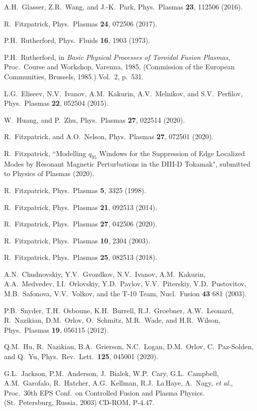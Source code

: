 \documentclass[12pt,prb,aps]{revtex4-1}
\begin{document}
\begin{thebibliography}{99}
 A.H.~Glasser, Z.R.~Wang, and J.-K.~Park, Phys.\ Plasmas {\bf 23}, 112506 (2016).

 R.~Fitzpatrick, Phys.\ Plasmas {\bf 24}, 072506 (2017). 

 P.H.~Rutherford,  Phys.\ Fluids  {\bf 16}, 1903 (1973).

 P.H.~Rutherford, in  {\it Basic Physical Processes of
Toroidal Fusion Plasmas}, Proc.\ Course and Workshop, Varenna, 1985. (Commission of the European Communities, Brussels, 1985.) Vol.~2, p.~531.

 L.G.~Eliseev, N.V.~Ivanov, A.M.~Kakurin, A.V.~Melnikov, and S.V.~Perfilov, Phys.\ Plasmas {\bf 22}, 052504 (2015). 

 W.~Huang, and P.~Zhu, Phys.\ Plasmas {\bf 27}, 022514 (2020).

 R.~Fitzpatrick, and A.O.~Nelson, Phys.\ Plasmas {\bf 27}, 072501 (2020).

 R.~Fitzpatrick,  ``Modelling $q_{95}$ Windows for the Suppression of Edge Localized
Modes by Resonant Magnetic Perturbations in the DIII-D Tokamak", submitted to Physics of Plasmas (2020).

 R.~Fitzpatrick, Phys.\ Plasmas {\bf 5}, 3325 (1998).

 R.~Fitzpatrick, Phys.\ Plasmas {\bf 21}, 092513 (2014).

 R.~Fitzpatrick, Phys.\ Plasmas {\bf 27}, 042506 (2020).

 R.~Fitzpatrick, Phys.\ Plasmas {\bf 10}, 2304 (2003).

 R.~Fitzpatrick, Phys.\ Plasmas {\bf 25}, 082513 (2018).			

 A.N.~Chudnovskiy, Y.V.~Gvozdkov, N.V.~Ivanov, A.M.~Kakurin,
A.A.~Medvedev, I.I.~Orlovskiy, Y.D.~Pavlov, V.V.~Piterskiy, V.D.~Pustovitov,
M.B.~Safonova, V.V.~Volkov, and the T-10 Team, Nucl.\ Fusion {\bf 43} 681 (2003).

 P.B.~Snyder, T.H.~Osboune, K.H.~Burrell, R.J.~Groebner, A.W.~Leonard, R.~Nazikian, D.M.~Orlov, O.~Schmitz, M.R.~Wade, and H.R.~Wilson, 
 Phys.\ Plasmas {\bf 19}, 056115 (2012).

 Q.M.~Hu, R.~Nazikian, B.A.~Grierson, N.C.~Logan, D.M.~Orlov, C.~Paz-Solden, and Q.~Yu, 
Phys.\ Rev.\ Lett.\ {\bf 125}, 045001 (2020).

 G.L.~Jackson, P.M.~Anderson, J.~Bialek, W.P.~Cary, G.L.~Campbell, A.M.~Garofalo,  R.~Hatcher, A.G.~Kellman, R.J.~La\,Haye, A.~Nagy, {\em et al.},  
Proc.\ 30th EPS Conf.\ on Controlled Fusion and Plasma Physics. (St.\ Petersburg, Russia, 2003) CD-ROM, P-4.47.


\end{thebibliography}
\end{document}
